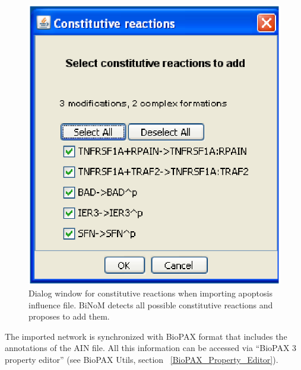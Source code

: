 \begin{figure}
\centering
\includegraphics[width=10 cm]{graphics/AIN_dialog_for_constitutive_reactions}
\caption{Dialog window for constitutive reactions when importing apoptosis influence file. BiNoM detects all possible constitutive reactions and proposes to add them.}
\label{AIN_dialog_for_constitutive_reactions}
\end{figure}
The imported network is synchronized with BioPAX format that includes the annotations of the AIN file. All this information can be accessed via “BioPAX 3 property editor” (see BioPAX Utils, section ~\ref{BioPAX_Property_Editor}).

